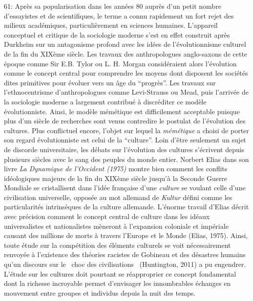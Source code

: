 61: Apr\`es sa popularisation dans les ann\'ees 80 aupr\`es d{\textquoteright}un petit nombre d{\textquoteright}essayistes et de scientifiques, le terme a connu rapidement un fort rejet des milieux acad\'emiques, particuli\`erement en sciences humaines. L{\textquoteright}appareil conceptuel et critique de la sociologie moderne s{\textquoteright}est en effet construit apr\`es Durkheim sur un antagonisme profond avec les id\'ees de l{\textquoteright}\'evolutionnisme culturel de la fin du XIX\`eme si\`ecle. Les travaux des anthropologues anglo-saxons de cette \'epoque comme Sir E.B. Tylor ou L. H. Morgan consid\'eraient alors l{\textquoteright}\'evolution comme le concept central pour comprendre les moyens dont disposent les soci\'et\'es dites primitives pour \'evoluer vers un \^age du {\textquotedblleft}progr\`es{\textquotedblright}. Les travaux sur l{\textquoteright}ethnocentrisme d{\textquoteright}anthropologues comme Levi-Strauss ou Mead, puis l{\textquoteright}arriv\'ee de la sociologie moderne a largement contribu\'e \`a discr\'editer ce mod\`ele \'evolutionniste. Ainsi, le mod\`ele m\'em\'etique est difficilement acceptable puisque plus d{\textquoteright}un si\`ecle de recherches sont venus contredire le postulat de l{\textquoteright}\'evolution des cultures. Plus conflictuel encore, l{\textquoteright}objet sur lequel la \textit{m\'em\'etique} a choisi de porter son regard \'evolutionniste est celui de la {\textquotedblleft}culture{\textquotedblright}. Loin d{\textquoteright}\^etre seulement un sujet de discorde universitaire, les d\'ebats sur l{\textquoteright}\'evolution des cultures s{\textquoteright}\'ecrivent depuis plusieurs si\`ecles avec le sang des peuples du monde entier. Norbert Elias dans son livre \textit{La Dynamique de l{\textquoteright}Occident (1975) }montre bien comment les conflits id\'eologiques majeurs de la fin du XIX\`eme si\`ecle jusqu{\textquoteright}\`a la Seconde Guerre Mondiale se cristallisent dans l{\textquoteright}id\'ee fran\c{c}aise d{\textquoteright}une \textit{culture} se voulant celle d{\textquoteright}une civilisation universelle, oppos\'ee au mot allemand de \textit{Kultur} d\'efini comme les particularit\'es intrins\`eques de la culture allemande. L{\textquoteright}\'enorme travail d{\textquoteright}Elias d\'ecrit avec pr\'ecision comment le concept central de culture dans les id\'eaux universalistes et nationalistes m\`eneront \`a l{\textquoteright}expansion coloniale et imp\'eriale causant des millions de morts \`a travers l{\textquoteright}Europe et le Monde (Elias, 1975). Ainsi, toute \'etude sur la comp\'etition des \'el\'ements culturels se voit n\'ecessairement renvoy\'ee \`a l{\textquoteright}existence des th\'eories racistes de Gobineau et des d\'esastres humains qu{\textquoteright}un discours sur le {\guillemotleft}~choc des civilisations~{\guillemotright} (Huntington, 2011) a pu engendrer. L{\textquoteright}\'etude sur les cultures doit pourtant se r\'eapproprier ce concept fondamental dont la richesse incroyable permet d{\textquoteright}envisager les innombrables \'echanges en mouvement entre groupes et individus depuis la nuit des temps. 
